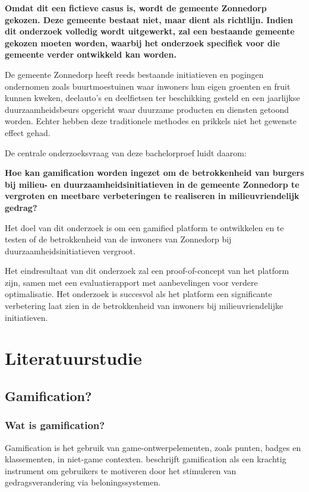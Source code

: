 \documentclass{hogent-article}
\begin{document}
\textbf{Omdat dit een fictieve casus is, wordt de gemeente Zonnedorp gekozen. Deze gemeente bestaat niet, maar dient als richtlijn. Indien dit onderzoek volledig wordt uitgewerkt, zal een bestaande gemeente gekozen moeten worden, waarbij het onderzoek specifiek voor die gemeente verder ontwikkeld kan worden.} 

De gemeente Zonnedorp heeft reeds bestaande initiatieven en pogingen ondernomen zoals buurtmoestuinen waar inwoners hun eigen groenten en fruit kunnen kweken, deelauto's en deelfietsen ter beschikking gesteld en een jaarlijkse duurzaamheidsbeurs opgericht waar duurzame producten en diensten getoond worden. Echter hebben deze traditionele methodes en prikkels niet het gewenste effect gehad. 

De centrale onderzoeksvraag van deze bachelorproef luidt daarom: 

\textbf{Hoe kan gamification worden ingezet om de betrokkenheid van burgers bij milieu- en duurzaamheidsinitiatieven in de gemeente Zonnedorp te vergroten en meetbare verbeteringen te realiseren in milieuvriendelijk gedrag?}

Het doel van dit onderzoek is om een gamified platform te ontwikkelen en te testen of de betrokkenheid van de inwoners van Zonnedorp bij duurzaamheidsinitiatieven vergroot.

Het eindresultaat van dit onderzoek zal een proof-of-concept van het platform zijn, samen met een evaluatierapport met aanbevelingen voor verdere optimalisatie. Het onderzoek is succesvol als het platform een significante verbetering laat zien in de betrokkenheid van inwoners bij milieuvriendelijke initiatieven.

\section{Literatuurstudie}%
\label{sec:literatuurstudie}
\subsection{Gamification?}
\subsubsection{Wat is gamification?}
Gamification is het gebruik van game-ontwerpelementen, zoals punten, badges en klassementen, in niet-game contexten. \autocite{Deterding2011} \textcite{Burke2016} beschrijft gamification als een krachtig instrument om gebruikers te motiveren door het stimuleren van gedragsverandering via beloningssystemen.
\end{document}
